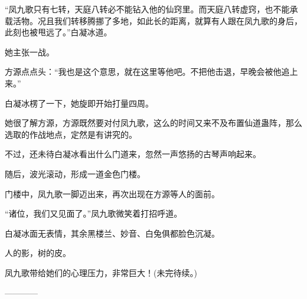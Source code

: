 \begin{this_body}
“凤九歌只有七转，天庭八转必不能钻入他的仙窍里。而天庭八转虚窍，也不能承载活物。况且我们转移腾挪了多地，如此长的距离，就算有人跟在凤九歌的身后，此刻也被甩远了。”白凝冰道。

她主张一战。

方源点点头：“我也是这个意思，就在这里等他吧。不把他击退，早晚会被他追上来。”

白凝冰楞了一下，她旋即开始打量四周。

她很了解方源，方源既然要对付凤九歌，这么的时间又来不及布置仙道蛊阵，那么选取的作战地点，定然是有讲究的。

不过，还未待白凝冰看出什么门道来，忽然一声悠扬的古琴声响起来。

随后，波光滚动，形成一道金色门楼。

门楼中，凤九歌一脚迈出来，再次出现在方源等人的面前。

“诸位，我们又见面了。”凤九歌微笑着打招呼道。

白凝冰面无表情，其余黑楼兰、妙音、白兔俱都脸色沉凝。

人的影，树的皮。

凤九歌带给她们的心理压力，非常巨大！(未完待续。)

------------

\end{this_body}

